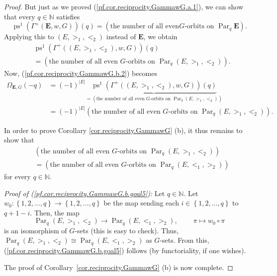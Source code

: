 \documentclass[12pt]{article}
\theoremstyle{plain}
\theoremstyle{definition}
\theoremstyle{remark}
\newcommand{\Par}{\operatorname{Par}}
\newcommand{\EE}{{\mathbf{E}}}
\newcommand{\NN}{{\mathbb{N}}}
\begin{document}
\begin{proof}
But just as we proved (\ref{pf.cor.reciprocity.GammawG.a.1}), we can show that
every $q\in \NN $ satisfies
\[
\operatorname{ps}^{1}\left(  \Gamma^{+}\left( \EE ,
w,G\right)  \right)  \left(  q\right)  =\left(  \text{the number of all even
}G\text{-orbits on } \Par_q \EE \right)  .
\]
Applying this to $\left(  E,>_{1},<_{2}\right)  $ instead of $\mathbf{E}$, we
obtain%
\begin{align*}
&  \operatorname{ps}^{1}\left(  \Gamma^{+}\left(  \left(
E,>_{1},<_{2}\right)  ,w,G\right)  \right)  \left(  q\right) \\
&  =\left(  \text{the number of all even }G\text{-orbits on }%
\Par_q \left(  E,>_{1},<_{2}\right)  \right)  .
\end{align*}
Now, (\ref{pf.cor.reciprocity.GammawG.b.2}) becomes%
\begin{align*}
\Omega_{\EE, G}\left(  -q\right)   &  =\left(  -1\right)  ^{\left\vert
E\right\vert }\underbrace{\operatorname{ps}^{1}\left(  \Gamma
^{+}\left(  \left(  E,>_{1},<_{2}\right)  ,w,G\right)  \right)  \left(
q\right)  }_{=\left(  \text{the number of all even }G\text{-orbits on }
\Par_q \left(  E,>_{1},<_{2}\right)  \right)  }\\
&  =\left(  -1\right)  ^{\left\vert E\right\vert }\left(  \text{the number of
all even }G\text{-orbits on }
\Par_q \left( E,>_{1},<_{2}\right)  \right)  .
\end{align*}


In order to prove Corollary \ref{cor.reciprocity.GammawG} (b), it thus remains
to show that
\begin{align}
&  \left(  \text{the number of all even }G\text{-orbits on }%
\Par_{q} \left(  E,>_{1},<_{2}\right)  \right)
\nonumber\\
&  =\left(  \text{the number of all even }G\text{-orbits on }%
\Par_{q} \left(  E,<_{1},>_{2}\right)  \right)
\label{pf.cor.reciprocity.GammawG.b.goal5}
\end{align}
for every $q\in \NN $.

\textit{Proof of (\ref{pf.cor.reciprocity.GammawG.b.goal5}):} Let
$q\in \NN $. Let $w_{0}:\left\{  1,2,\ldots,q\right\}  \rightarrow
\left\{  1,2,\ldots,q\right\}  $ be the map sending each $i\in\left\{
1,2,\ldots,q\right\}  $ to $q+1-i$. Then, the map
\[
 \Par_q \left(  E,>_{1},<_{2}\right)  \rightarrow
 \Par_q \left(  E,<_{1},>_{2}\right)
,\ \ \ \ \ \ \ \ \ \ \pi\mapsto w_{0}\circ\pi
\]
is an isomorphism of $G$-sets (this is easy to check). Thus, \newline
$\Par_q \left(  E,>_{1},<_{2}\right)  \cong
 \Par_q \left(  E,<_{1},>_{2}\right)  $ as $G$-sets.
From this, (\ref{pf.cor.reciprocity.GammawG.b.goal5}) follows (by
functoriality, if one wishes).

The proof of Corollary~\ref{cor.reciprocity.GammawG} (b) is now complete.
\end{proof}
\end{document}
